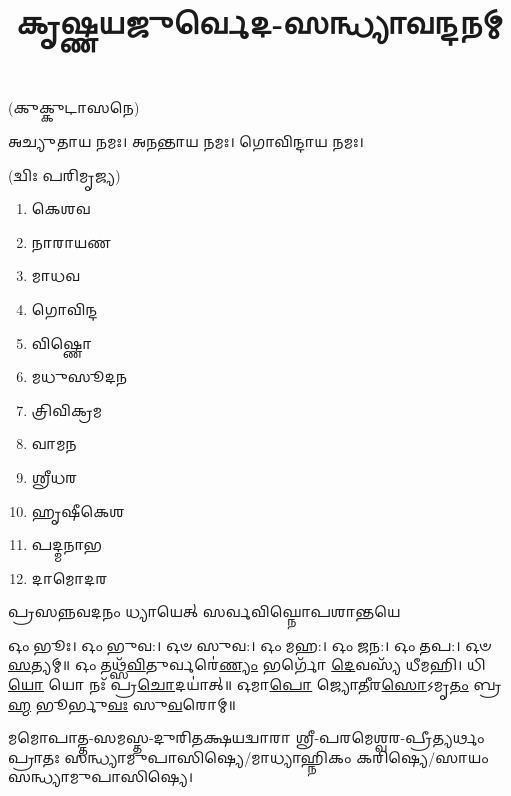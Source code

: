 \setmainfont[Scale=0.50,Script=Grantha,Mapping=tex-text,Mapping=devanagarinumerals,AutoFakeBold=2.0]{Noto Serif Grantha}
\title{\Huge 𑌕𑍃𑌷𑍍𑌣𑌯𑌜𑍁𑌰𑍍𑌵𑍇𑌦-𑌸𑌨𑍍𑌧𑍍𑌯𑌾𑌵𑌨𑍍𑌦𑌨𑌮𑍍}
\date{}
\maketitle

\clearpage


(𑌕𑍁𑌕𑍍𑌕𑍁𑌟𑌾𑌸𑌨𑍇)

𑌅𑌚𑍍𑌯𑍁𑌤𑌾𑌯 𑌨𑌮𑌃। 𑌅𑌨𑌨𑍍𑌤𑌾𑌯 𑌨𑌮𑌃। 𑌗𑍋𑌵𑌿𑌨𑍍𑌦𑌾𑌯 𑌨𑌮𑌃। 

(𑌦𑍍𑌵𑌿𑌃 𑌪𑌰𑌿𑌮𑍃𑌜𑍍𑌯)


\begin{multicols}{3}
\begin{enumerate}
    \item 𑌕𑍇𑌶𑌵
    \item 𑌨𑌾𑌰𑌾𑌯𑌣
    \item 𑌮𑌾𑌧𑌵
    \item 𑌗𑍋𑌵𑌿𑌨𑍍𑌦
    \item 𑌵𑌿𑌷𑍍𑌣𑍋
    \item 𑌮𑌧𑍁𑌸𑍂𑌦𑌨
    \item 𑌤𑍍𑌰𑌿𑌵𑌿𑌕𑍍𑌰𑌮
    \item 𑌵𑌾𑌮𑌨
    \item 𑌶𑍍𑌰𑍀𑌧𑌰
    \item 𑌹𑍃𑌷𑍀𑌕𑍇𑌶
    \item 𑌪𑌦𑍍𑌮𑌨𑌾𑌭
    \item 𑌦𑌾𑌮𑍋𑌦𑌰
\end{enumerate}
\end{multicols}


{𑌪𑍍𑌰𑌸𑌨𑍍𑌨𑌵𑌦𑌨𑌂 𑌧𑍍𑌯𑌾𑌯𑍇𑌤𑍍 𑌸𑌰𑍍𑌵𑌵𑌿𑌘𑍍𑌨𑍋𑌪𑌶𑌾𑌨𑍍𑌤𑌯𑍇}


𑌓𑌂 𑌭𑍂𑌃। 𑌓𑌂 𑌭𑍁𑌵:। 𑌓𑍞 𑌸𑍁𑌵:। 𑌓𑌂 𑌮𑌹:। 𑌓𑌂 𑌜𑌨:। 𑌓𑌂 𑌤𑌪:। 𑌓𑍞 \ul{𑌸}\-𑌤𑍍𑌯𑌮𑍍॥
𑌓𑌂 𑌤𑌥𑍍𑌸᳴\-\ul{𑌵𑌿}\-𑌤𑍁𑌰𑍍𑌵𑌰𑍇॑\-\ul{𑌣𑍍𑌯𑌂} 𑌭𑌰𑍍𑌗𑍋᳴ \ul{𑌦𑍇}\-𑌵𑌸𑍍𑌯᳴ 𑌧𑍀𑌮𑌹𑌿। 𑌧𑌿\-\ul{𑌯𑍋} 𑌯𑍋 𑌨𑌃᳴ 𑌪𑍍𑌰\-\ul{𑌚𑍋}\-𑌦𑌯𑌾॑𑌤𑍍॥
𑌓𑌮𑌾\-\ul{𑌪𑍋} 𑌜𑍍𑌯𑍋\-\ul{𑌤𑍀}\-𑌰\-\ul{𑌸𑍋}\-𑌽𑌮𑍃\-\ul{𑌤𑌂} 𑌬𑍍𑌰\-\ul{𑌹𑍍𑌮} 𑌭𑍂𑌰𑍍𑌭𑍁\-\ul{𑌵𑌃} 𑌸𑍁\-\ul{𑌵}\-𑌰𑍋𑌮𑍍॥


𑌮𑌮𑍋𑌪𑌾𑌤𑍍𑌤-𑌸𑌮𑌸𑍍𑌤-𑌦𑍁𑌰𑌿𑌤𑌕𑍍𑌷𑌯𑌦𑍍𑌵𑌾𑌰𑌾 𑌶𑍍𑌰𑍀-𑌪𑌰𑌮𑍇𑌶𑍍𑌵𑌰-𑌪𑍍𑌰𑍀𑌤𑍍𑌯𑌰𑍍𑌥𑌂 𑌪𑍍𑌰𑌾𑌤𑌃 𑌸𑌨𑍍𑌧𑍍𑌯𑌾𑌮𑍁𑌪𑌾𑌸𑌿𑌷𑍍𑌯𑍇/𑌮𑌾𑌧𑍍𑌯𑌾𑌹𑍍𑌨𑌿𑌕𑌂 𑌕𑌰𑌿𑌷𑍍𑌯𑍇/𑌸𑌾𑌯𑌂 𑌸𑌨𑍍𑌧𑍍𑌯𑌾𑌮𑍁𑌪𑌾𑌸𑌿𑌷𑍍𑌯𑍇।

